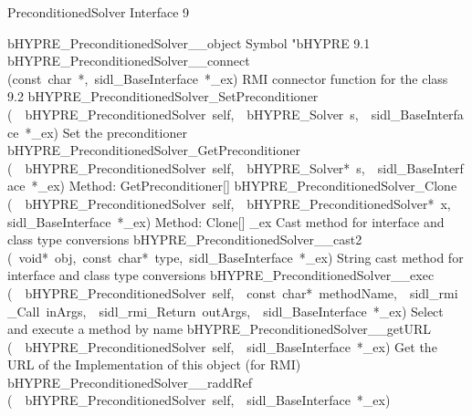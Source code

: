 \documentclass{article}
\begin{document}
\begin{cxxentry}
{}
        {PreconditionedSolver Interface}
        {}
        {
}
        {9}
\begin{cxxnames}
        {bHYPRE\_PreconditionedSolver\_\_object}
        {}
        {
Symbol "bHYPRE}
        {9.1}
        {bHYPRE\_PreconditionedSolver\_\_connect}
        {(const\ char\ *,\ sidl\_BaseInterface\ *\_ex)}
        {
RMI connector function for the class}
        {9.2}
        {bHYPRE\_PreconditionedSolver\_SetPreconditioner}
        {(\ \ bHYPRE\_PreconditionedSolver\ self,\ \ bHYPRE\_Solver\ s,\ \ sidl\_BaseInterface\ *\_ex)}
        {
Set the preconditioner}
        {}
\label{cxx.9.4}
        {bHYPRE\_PreconditionedSolver\_GetPreconditioner}
        {(\ \ bHYPRE\_PreconditionedSolver\ self,\ \ bHYPRE\_Solver*\ s,\ \ sidl\_BaseInterface\ *\_ex)}
        {
Method:  GetPreconditioner[]}
        {}
\label{cxx.9.5}
        {bHYPRE\_PreconditionedSolver\_Clone}
        {(\ \ bHYPRE\_PreconditionedSolver\ self,\ \ bHYPRE\_PreconditionedSolver*\ x,\ \ sidl\_BaseInterface\ *\_ex)}
        {
Method:  Clone[]}
        {}
\label{cxx.9.6}
        {\_ex}
        {}
        {
Cast method for interface and class type conversions}
        {}
\label{cxx.9.7}
        {bHYPRE\_PreconditionedSolver\_\_cast2}
        {(\ void*\ obj,\ const\ char*\ type,\ sidl\_BaseInterface\ *\_ex)}
        {
String cast method for interface and class type conversions}
        {}
\label{cxx.9.8}
        {bHYPRE\_PreconditionedSolver\_\_exec}
        {(\ \ bHYPRE\_PreconditionedSolver\ self,\ \ const\ char*\ methodName,\ \ sidl\_rmi\_Call\ inArgs,\ \ sidl\_rmi\_Return\ outArgs,\ \ sidl\_BaseInterface\ *\_ex)}
        {
Select and execute a method by name}
        {}
\label{cxx.9.9}
        {bHYPRE\_PreconditionedSolver\_\_getURL}
        {(\ \ bHYPRE\_PreconditionedSolver\ self,\ \ sidl\_BaseInterface\ *\_ex)}
        {
Get the URL of the Implementation of this object (for RMI)}
        {}
\label{cxx.9.10}
        {bHYPRE\_PreconditionedSolver\_\_raddRef}
        {(\ \ bHYPRE\_PreconditionedSolver\ self,\ \ sidl\_BaseInterface\ *\_ex)}

\end{cxxnames}
\end{cxxentry}
\end{document}
